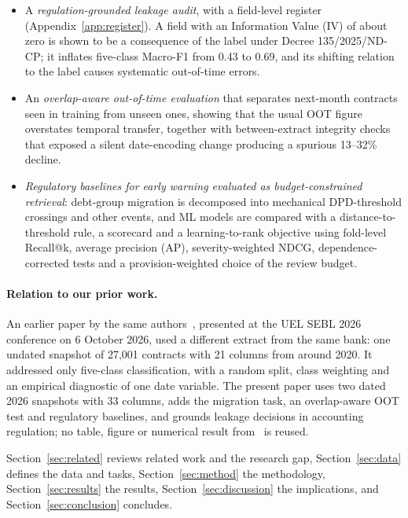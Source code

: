 \documentclass[runningheads]{llncs}
\begin{document}
\begin{itemize}
\item[\textbf{C1}] A \emph{regulation-grounded leakage audit}, with a field-level register (Appendix~\ref{app:register}). A field with an Information Value (IV) of about zero is shown to be a consequence of the label under Decree 135/2025/ND-CP; it inflates five-class Macro-F1 from 0.43 to 0.69, and its shifting relation to the label causes systematic out-of-time errors.
\item[\textbf{C2}] An \emph{overlap-aware out-of-time evaluation} that separates next-month contracts seen in training from unseen ones, showing that the usual OOT figure overstates temporal transfer, together with between-extract integrity checks that exposed a silent date-encoding change producing a spurious 13--32\% decline.
\item[\textbf{C3}] \emph{Regulatory baselines for early warning evaluated as budget-constrained retrieval}: debt-group migration is decomposed into mechanical DPD-threshold crossings and other events, and ML models are compared with a distance-to-threshold rule, a scorecard and a learning-to-rank objective using fold-level Recall@k, average precision (AP), severity-weighted NDCG, dependence-corrected tests and a provision-weighted choice of the review budget.
\end{itemize}

\paragraph{Relation to our prior work.} An earlier paper by the same authors~\cite{an2026sebl}, presented at the UEL SEBL 2026 conference on 6 October 2026, used a different extract from the same bank: one undated snapshot of 27,001 contracts with 21 columns from around 2020. It addressed only five-class classification, with a random split, class weighting and an empirical diagnostic of one date variable. The present paper uses two dated 2026 snapshots with 33 columns, adds the migration task, an overlap-aware OOT test and regulatory baselines, and grounds leakage decisions in accounting regulation; no table, figure or numerical result from~\cite{an2026sebl} is reused.

Section~\ref{sec:related} reviews related work and the research gap, Section~\ref{sec:data} defines the data and tasks, Section~\ref{sec:method} the methodology, Section~\ref{sec:results} the results, Section~\ref{sec:discussion} the implications, and Section~\ref{sec:conclusion} concludes.
\end{document}
